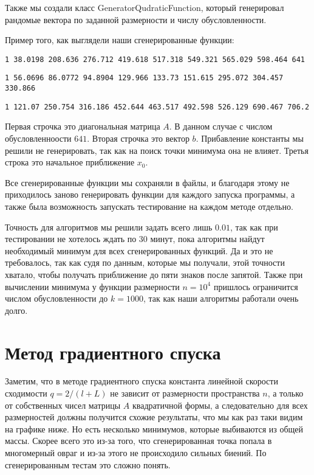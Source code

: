 Также мы создали класс GeneratorQudraticFunction, который генерировал рандомые
 вектора по заданной размерности и числу обусловленности.

 Пример того, как выглядели наши сгенерированные функции:
\newline

\texttt{\small 1 38.0198 208.636 276.712 419.618 517.318 549.321 565.029 598.464 641 }

\texttt{\small 1 56.0696 86.0772 94.8904 129.966 133.73 151.615 295.072 304.457 330.866 }

\texttt{\small 1 121.07 250.754 316.186 452.644 463.517 492.598 526.129 690.467 706.2} 
\newline

Первая строчка это диагональная матрица $A$. В данном случае с числом обусловленноости $641$.
Вторая строчка это вектор $b$. Прибавление константы мы решили не генерировать, так как на поиск точки
минимума она не влияет. Третья строка это начальное приближение $x_0$. 

Все сгенерированные функции мы сохраняли в файлы,
и благодаря этому не приходилось заново генерировать функции для каждого запуска программы, а также была
возможность запускать тестирование на каждом методе отдельно. 

Точность для алгоритмов мы решили задать всего лишь $0.01$, так как при тестировании не хотелось ждать по 30 минут, пока
алгоритмы найдут необходимый минимум для всех сгенерированных функций. Да и это не требовалось, так как судя по
данным, которые мы получали, этой точности хватало, чтобы получать приближение до пяти знаков после запятой.
 Также при вычислении минимума 
у функции размерности
$n = 10^4$ пришлось ограничится числом обусловленности до $k = 1000$, так как наши алгоритмы работали очень долго.





\section{Метод градиентного спуска}

Заметим, что в методе градиентного спуска константа линейной скорости сходимости $q = 2/(l + L)$ не зависит
от размерности пространства $n$, а только от собственных чисел матрицы $A$ квадратичной формы, а следовательно
для всех размерностей должны получится схожие результаты, что мы как раз таки видим на графике ниже.
Но есть несколько минимумов, которые выбиваются из общей массы.
 Скорее всего это из-за того, что сгенерированная
точка попала в многомерный овраг и из-за этого не происходило сильных биений. По сгенерированным
тестам это сложно понять.



